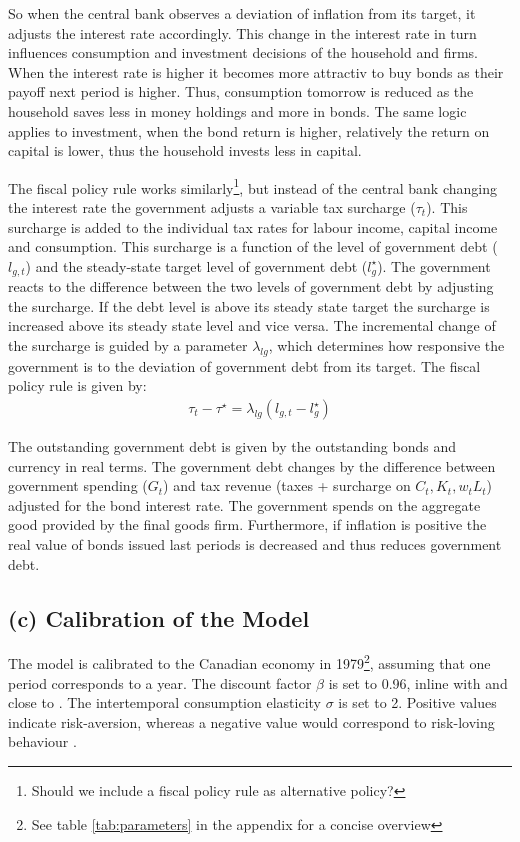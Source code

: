 \documentclass[12pt]{article}
\begin{document}
So when the central bank observes a deviation of inflation from its target, it adjusts the interest rate accordingly. This change in the interest rate in turn influences consumption and investment decisions of the household and firms. When the interest rate is higher it becomes more attractiv to buy bonds as their payoff next period is higher. Thus, consumption tomorrow is reduced as the household saves less in money holdings and more in bonds. The same logic applies to investment, when the bond return is higher, relatively the return on capital is lower, thus the household invests less in capital.

The fiscal policy rule works similarly\footnote{Should we include a fiscal policy rule as alternative policy?}, but instead of the central bank changing the interest rate the government adjusts a variable tax surcharge ($\tau_t$). This surcharge is added to the individual tax rates for labour income, capital income and consumption. This surcharge is a function of the level of government debt ($l_{g,t}$) and the steady-state target level of government debt ($l^{\star}_{g}$). The government reacts to the difference between the two levels of government debt by adjusting the surcharge. If the debt level is above its steady state target the surcharge is increased above its steady state level and vice versa. The incremental change of the surcharge is guided by a parameter $\lambda_{l g}$, which determines how responsive the government is to the deviation of government debt from its target. The fiscal policy rule is given by:
\begin{align}
    \tau_t - \tau^{\star} = \lambda_{l g} (l_{g,t} - l^{\star}_{g})
\end{align}

The outstanding government debt is given by the outstanding bonds and currency in real terms. The government debt changes by the difference between government spending ($G_t$) and tax revenue (taxes + surcharge on $C_t, K_t, w_tL_t$) adjusted for the bond interest rate. The government spends on the aggregate good provided by the final goods firm. Furthermore, if inflation is positive the real value of bonds issued last periods is decreased and thus reduces government debt.


\subsection*{(c) Calibration of the Model}
The model is calibrated to the Canadian economy in 1979\footnote{See table \ref{tab:parameters} in the appendix for a concise overview}, assuming that one period corresponds to a year. 
The discount factor $\beta$ is set to 0.96, inline with \textcite{someOilDemandSupply2023} and close to \textcite{corriganToTEMIIIBank2021}. 
The intertemporal consumption elasticity $\sigma$ is set to 2. Positive values indicate risk-aversion, whereas a negative value would correspond to risk-loving behaviour
\parencite{thimmeIntertemporalSubstitutionConsumption2017}.
\end{document}
